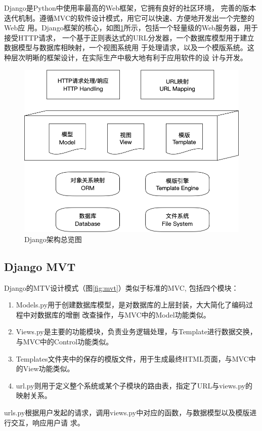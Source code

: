 \documentclass{ede}
\begin{document}
Django\cite{nowamagic, 杨武帅2018基于}是Python中使用率最高的Web框架，它拥有良好的社区环境，
完善的版本迭代机制。遵循MVC的软件设计模式，用它可以快速、方便地开发出一个完整的Web应
用。Django框架的核心，如图\ref{fig:django}所示，包括一个轻量级的Web服务器，用于接受HTTP请求，
一个基于正则表达式的URL分发器，一个数据库模型用于建立数据模型与数据库相映射，一个视图系统用
于处理请求，以及一个模版系统。这种层次明晰的框架设计，在实际生产中极大地有利于应用软件的设
计与开发。

\begin{figure}%
  \centering
  \includegraphics [width=.8\columnwidth]{./img/django}      
  \caption{Django架构总览图}\label{fig:django}
\end{figure}

\subsection{Django MVT}

Django的MTV设计模式（图\ref{fig:mvt}）类似于标准的MVC, 包括四个模块：
\begin{enumerate}
\item Models.py用于创建数据库模型，是对数据库的上层封装，大大简化了编码过程中对数据库的增删
  改查操作，与MVC中的Model功能类似。
\item Views.py是主要的功能模块，负责业务逻辑处理，与Template进行数据交换，
  与MVC中的Control功能类似。
\item Templates文件夹中的保存的模版文件，用于生成最终HTML页面，与MVC中的View功能类似。
\item url.py则用于定义整个系统或某个子模块的路由表，指定了URL与views.py的映射关系。
\end{enumerate}
urls.py根据用户发起的请求，调用views.py中对应的函数，与数据模型以及模版进行交互，响应用户请
求。
\end{document}
